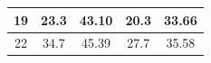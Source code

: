\documentclass{article}
\begin{document}
\begin{Large}
\begin{table}[h]
\begin{tabular}{|c|cc|cc|}
19                                                                       & \multicolumn{1}{c|}{23.3}                                                    & 43.10                                                       & \multicolumn{1}{c|}{20.3}                                                    & 33.66                                                       \\ \hline
22                                                                       & \multicolumn{1}{c|}{34.7}                                                    & 45.39                                                       & \multicolumn{1}{c|}{27.7}                                                    & 35.58                                                       \\ \hline
\end{tabular}
\end{table}


\end{Large}
\end{document}

